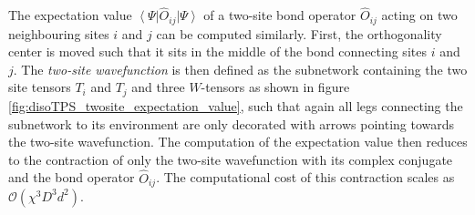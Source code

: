 The expectation value $\left\langle\Psi\right|\hat{O}_{ij}\left|\Psi\right\rangle$ of a two-site bond operator $\hat{O}_{ij}$ acting on two neighbouring sites $i$ and $j$ can be computed similarly. First, the orthogonality center is moved such that it sits in the middle of the bond connecting sites $i$ and $j$. The \textit{two-site wavefunction} is then defined as the subnetwork containing the two site tensors $T_i$ and $T_j$ and three $W$-tensors as shown in figure \ref{fig:disoTPS_twosite_expectation_value}, such that again all legs connecting the subnetwork to its environment are only decorated with arrows pointing towards the two-site wavefunction. The computation of the expectation value then reduces to the contraction of only the two-site wavefunction with its complex conjugate and the bond operator $\hat{O}_{ij}$. The computational cost of this contraction scales as $\mathcal{O}\left(\chi^3D^3d^2\right)$.